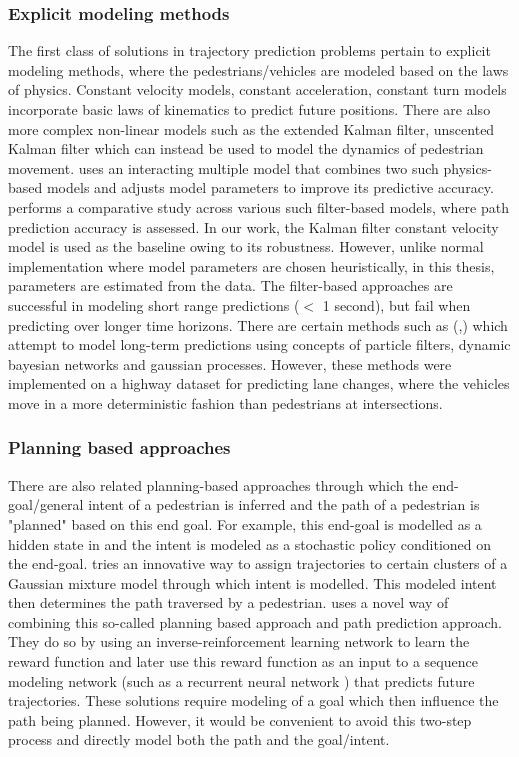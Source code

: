 \documentclass{article}
\begin{document}
\subsubsection{Explicit modeling methods}
The first class of solutions in trajectory prediction problems pertain to explicit modeling methods, where the pedestrians/vehicles are modeled based on the laws of physics. Constant velocity models, constant acceleration, constant turn models incorporate basic laws of kinematics to predict future positions. There are also more complex non-linear models such as the extended Kalman filter\cite{julier_new_1997}, unscented Kalman filter\cite{noauthor_unscented_nodate} which can instead be used to model the dynamics of pedestrian movement. \cite{wu_interacting_2020} uses an interacting multiple model\cite{mazor_interacting_1998} that combines two such physics-based models and adjusts model parameters to improve its predictive accuracy. \cite{hutchison_pedestrian_2013} performs a comparative study across various such filter-based models, where path prediction accuracy is assessed. In our work, the Kalman filter constant velocity model is used as the baseline owing to its robustness. However, unlike normal implementation where model parameters are chosen heuristically, in this thesis, parameters are estimated from the data. The filter-based approaches are successful in modeling short range predictions ($<$ 1 second), but fail when predicting over longer time horizons. There are certain methods such as (\cite{hoermann_probabilistic_2017},\cite{liu_probabilistic_2022}) which attempt to model long-term predictions using concepts of particle filters, dynamic bayesian networks and gaussian processes. However, these methods were implemented on a highway dataset for predicting lane changes, where the vehicles move in a more deterministic fashion than pedestrians at intersections. 
\subsubsection{Planning based approaches}
There are also related planning-based approaches through which the end-goal/general intent of a pedestrian is inferred and the path of a pedestrian is "planned" based on this end goal.  For example, this end-goal is modelled as a hidden state in \cite{karasev_intent-aware_2016} and the intent is modeled as a stochastic policy conditioned on the end-goal. \cite{wiest_probabilistic_2012} tries an innovative way to assign trajectories to certain clusters of a Gaussian mixture model through which intent is modelled. This modeled intent then determines the path traversed by a pedestrian. \cite{saleh_long-term_2018} uses a novel way of combining this so-called planning based approach and path prediction approach. They do so by using an inverse-reinforcement learning network to learn the reward function and later use this reward function as an input to a sequence modeling network (such as a recurrent neural network \cite{miikkulainen_simple_2010}) that predicts future trajectories. These solutions require modeling of a goal which then influence the path being planned. However, it would be convenient to avoid this two-step process and directly model both the path and the goal/intent. 
\end{document}
